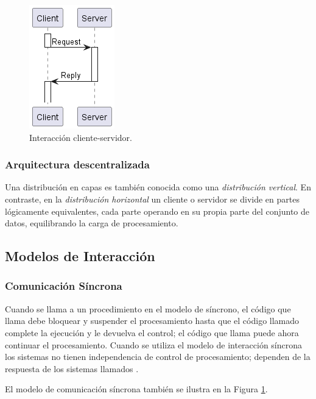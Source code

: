 \documentclass[conference,compsoc]{IEEEtran}
\begin{document}
\begin{figure}[hb]
    \centering
    \includegraphics[width=0.35\columnwidth]{client-server.png}
    \caption{Interacción cliente-servidor.}
    \label{fig:client_server}
\end{figure}

\subsubsection{Arquitectura descentralizada}

Una distribución en capas es también conocida como una \emph{distribución vertical}. En contraste, en la \emph{distribución horizontal} un cliente o servidor se divide en partes lógicamente equivalentes, cada parte operando en su propia parte del conjunto de datos, equilibrando la carga de procesamiento\cite{steen_tanenbaum_2017}.

\subsection{Modelos de Interacción}

\subsubsection{Comunicación Síncrona}

Cuando se llama a un procedimiento en el modelo de síncrono, el código que llama debe bloquear y suspender el procesamiento hasta que el código llamado complete la ejecución y le devuelva el control; el código que llama puede ahora continuar el procesamiento. Cuando se utiliza el modelo de interacción síncrona los sistemas no tienen independencia de control de procesamiento; dependen de la respuesta de los sistemas llamados \cite{curry_2004}.

El modelo de comunicación síncrona también se ilustra en la Figura \ref{fig:client_server}.
\end{document}

